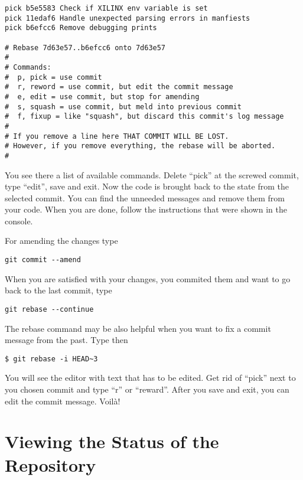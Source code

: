 \begin{lstlisting}
pick b5e5583 Check if XILINX env variable is set
pick 11edaf6 Handle unexpected parsing errors in manfiests
pick b6efcc6 Remove debugging prints

# Rebase 7d63e57..b6efcc6 onto 7d63e57
#
# Commands:
#  p, pick = use commit
#  r, reword = use commit, but edit the commit message
#  e, edit = use commit, but stop for amending
#  s, squash = use commit, but meld into previous commit
#  f, fixup = like "squash", but discard this commit's log message
#
# If you remove a line here THAT COMMIT WILL BE LOST.
# However, if you remove everything, the rebase will be aborted.
#
\end{lstlisting}
You see there a list of available commands. Delete ``pick'' at the screwed commit, type ``edit'', save and exit. Now the code is brought back to the state from the selected commit. You can find the unneeded messages and remove them from your code. When you are done, follow the instructions that were shown in the console.

For amending the changes type
\begin{lstlisting}
git commit --amend
\end{lstlisting}
When you are satisfied with your changes, you commited them and want to go back to the last commit, type
\begin{lstlisting}
git rebase --continue
\end{lstlisting}
\vspace{1cm}
The rebase command may be also helpful when you want to fix a commit message from the past. Type then
\begin{lstlisting}
$ git rebase -i HEAD~3
\end{lstlisting}
You will see the editor with text that has to be edited. Get rid of ``pick'' next to you chosen commit and type ``r'' or ``reward''. After you save and exit, you can edit the commit message. Voilà!
\section{Viewing the Status of the Repository}
